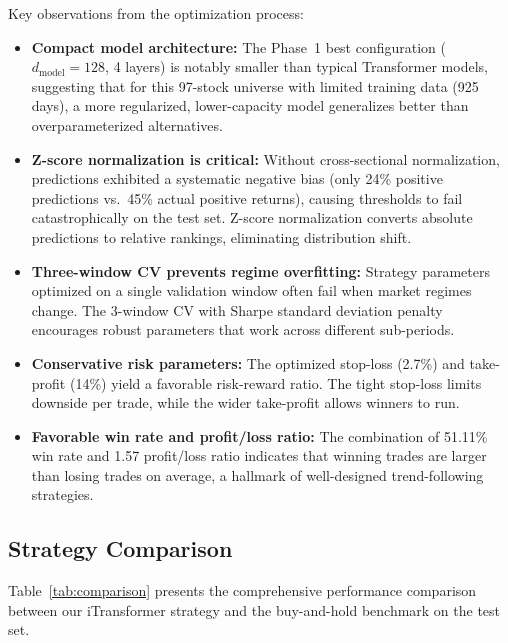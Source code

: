 \documentclass[12pt, a4paper]{article}
\begin{document}
Key observations from the optimization process:
\begin{itemize}[leftmargin=2em]
    \item \textbf{Compact model architecture:} The Phase~1 best configuration ($d_{\text{model}} = 128$, 4 layers) is notably smaller than typical Transformer models, suggesting that for this 97-stock universe with limited training data (925 days), a more regularized, lower-capacity model generalizes better than overparameterized alternatives.
    \item \textbf{Z-score normalization is critical:} Without cross-sectional normalization, predictions exhibited a systematic negative bias (only 24\% positive predictions vs.\ 45\% actual positive returns), causing thresholds to fail catastrophically on the test set. Z-score normalization converts absolute predictions to relative rankings, eliminating distribution shift.
    \item \textbf{Three-window CV prevents regime overfitting:} Strategy parameters optimized on a single validation window often fail when market regimes change. The 3-window CV with Sharpe standard deviation penalty encourages robust parameters that work across different sub-periods.
    \item \textbf{Conservative risk parameters:} The optimized stop-loss (2.7\%) and take-profit (14\%) yield a favorable risk-reward ratio. The tight stop-loss limits downside per trade, while the wider take-profit allows winners to run.
    \item \textbf{Favorable win rate and profit/loss ratio:} The combination of 51.11\% win rate and 1.57 profit/loss ratio indicates that winning trades are larger than losing trades on average, a hallmark of well-designed trend-following strategies.
\end{itemize}

\subsection{Strategy Comparison}

Table~\ref{tab:comparison} presents the comprehensive performance comparison between our iTransformer strategy and the buy-and-hold benchmark on the test set.
\end{document}
